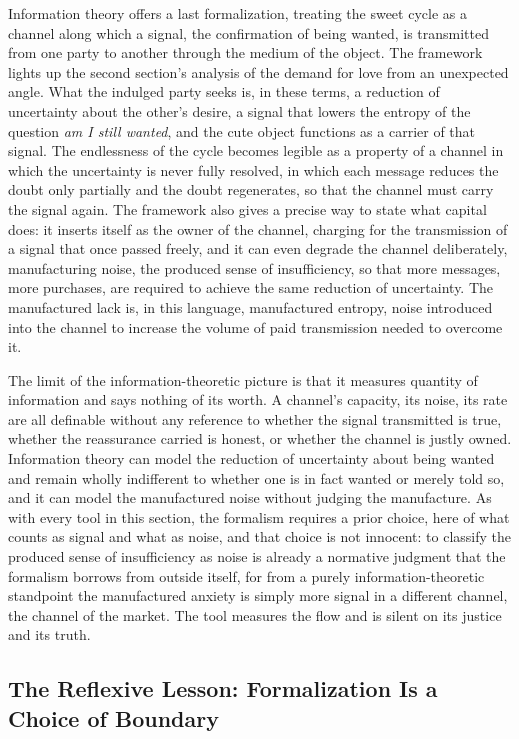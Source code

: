 Information theory offers a last formalization, treating the sweet cycle as a channel along which a signal, the confirmation of being wanted, is transmitted from one party to another through the medium of the object. The framework lights up the second section's analysis of the demand for love from an unexpected angle. What the indulged party seeks is, in these terms, a reduction of uncertainty about the other's desire, a signal that lowers the entropy of the question \textit{am I still wanted}, and the cute object functions as a carrier of that signal. The endlessness of the cycle becomes legible as a property of a channel in which the uncertainty is never fully resolved, in which each message reduces the doubt only partially and the doubt regenerates, so that the channel must carry the signal again. The framework also gives a precise way to state what capital does: it inserts itself as the owner of the channel, charging for the transmission of a signal that once passed freely, and it can even degrade the channel deliberately, manufacturing noise, the produced sense of insufficiency, so that more messages, more purchases, are required to achieve the same reduction of uncertainty. The manufactured lack is, in this language, manufactured entropy, noise introduced into the channel to increase the volume of paid transmission needed to overcome it.

The limit of the information-theoretic picture is that it measures quantity of information and says nothing of its worth. A channel's capacity, its noise, its rate are all definable without any reference to whether the signal transmitted is true, whether the reassurance carried is honest, or whether the channel is justly owned. Information theory can model the reduction of uncertainty about being wanted and remain wholly indifferent to whether one is in fact wanted or merely told so, and it can model the manufactured noise without judging the manufacture. As with every tool in this section, the formalism requires a prior choice, here of what counts as signal and what as noise, and that choice is not innocent: to classify the produced sense of insufficiency as noise is already a normative judgment that the formalism borrows from outside itself, for from a purely information-theoretic standpoint the manufactured anxiety is simply more signal in a different channel, the channel of the market. The tool measures the flow and is silent on its justice and its truth.

\subsection{The Reflexive Lesson: Formalization Is a Choice of Boundary}

